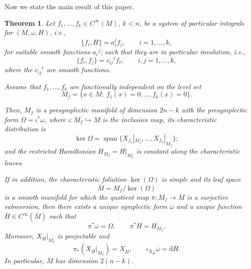 \documentclass[10pt,a4paper]{article}
\newtheorem{theorem}{Theorem}
\begin{document}
Now we state the main result of this paper.
\begin{theorem}
\label{maintheorem}
Let $f_1,\ldots,f_k\in C^\infty(M)$, $k<n$, be a system of particular integrals for $(M,\omega,H)$, i.e., 
\begin{equation*}
\{f_i,H\}=a_{i}^j f_j,
\qquad i=1,\ldots,k,
\end{equation*}
for suitable smooth functions $a_i{}^j$; such that they are in particular involution, i.e.,
\begin{equation}
\{f_i,f_j\}=c_{ij}{}^\ell f_\ell,
\qquad i,j=1,\ldots,k,
\label{eq:weak-involution}
\end{equation}
where the $c_{ij}{}^\ell$ are smooth functions. 

Assume that $f_1,\ldots,f_k$ are functionally independent on the level set
\begin{equation*}
M_f=\{x\in M:\ f_1(x)=0,\ldots,f_k(x)=0\}.
\end{equation*}

Then, $M_f$ is a presymplectic manifold of dimension $2n-k$ with the presymplectic form $\Omega=\iota^{*}\omega$, where $\iota\colon M_f \hookrightarrow M$ is the inclusion map, its characteristic distribution is
\begin{equation*}
\ker\Omega=\operatorname{span}\bigl\{X_{f_1}|_{M_f},\ldots,X_{f_k}|_{M_f}\bigr\};
\end{equation*}
and the restricted Hamiltonian $H_{M_f}=H|_{M_f}$ is constant along the characteristic leaves.

If in addition, the characteristic foliation $\ker(\Omega)$ is simple and its leaf space
\[
  \overline{M}=M_f/\ker(\Omega)
\]
is a smooth manifold for which the quotient map
\(\pi:M_f\to \overline{M}\) is a surjective submersion, then there exists a unique symplectic form $\overline{\omega}$ and a unique function
$\overline{H}\in C^\infty(\overline{M})$ such that
\begin{equation}
  \pi^*\overline{\omega}=\Omega,
  \qquad
  \pi^*\overline{H}=H_{M_f}.
  \label{eq:reduced-form-and-Hamiltonian}
\end{equation}
Moreover, $X_H|_{M_f}$ is projectable and
\begin{equation}
  \pi_*(X_H|_{M_f})=X_{\overline{H}},
  \qquad
  \iota_{X_{\overline{H}}}\overline{\omega}
  =\mathrm d\overline{H}.
  \label{eq:projected-Hamiltonian-vector-field}
\end{equation}
In particular, $\overline{M}$ has dimension $2(n-k)$.
\end{theorem}
\end{document}
